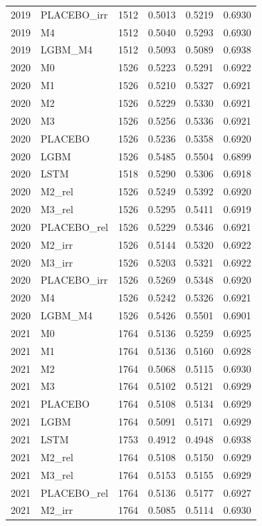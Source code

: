 \begin{tabular}{llrrrr}
2019 & PLACEBO\_irr & 1512 & 0.5013 & 0.5219 & 0.6930 \\
2019 & M4 & 1512 & 0.5040 & 0.5293 & 0.6930 \\
2019 & LGBM\_M4 & 1512 & 0.5093 & 0.5089 & 0.6938 \\
2020 & M0 & 1526 & 0.5223 & 0.5291 & 0.6922 \\
2020 & M1 & 1526 & 0.5210 & 0.5327 & 0.6921 \\
2020 & M2 & 1526 & 0.5229 & 0.5330 & 0.6921 \\
2020 & M3 & 1526 & 0.5256 & 0.5336 & 0.6921 \\
2020 & PLACEBO & 1526 & 0.5236 & 0.5358 & 0.6920 \\
2020 & LGBM & 1526 & 0.5485 & 0.5504 & 0.6899 \\
2020 & LSTM & 1518 & 0.5290 & 0.5306 & 0.6918 \\
2020 & M2\_rel & 1526 & 0.5249 & 0.5392 & 0.6920 \\
2020 & M3\_rel & 1526 & 0.5295 & 0.5411 & 0.6919 \\
2020 & PLACEBO\_rel & 1526 & 0.5229 & 0.5346 & 0.6921 \\
2020 & M2\_irr & 1526 & 0.5144 & 0.5320 & 0.6922 \\
2020 & M3\_irr & 1526 & 0.5203 & 0.5321 & 0.6922 \\
2020 & PLACEBO\_irr & 1526 & 0.5269 & 0.5348 & 0.6920 \\
2020 & M4 & 1526 & 0.5242 & 0.5326 & 0.6921 \\
2020 & LGBM\_M4 & 1526 & 0.5426 & 0.5501 & 0.6901 \\
2021 & M0 & 1764 & 0.5136 & 0.5259 & 0.6925 \\
2021 & M1 & 1764 & 0.5136 & 0.5160 & 0.6928 \\
2021 & M2 & 1764 & 0.5068 & 0.5115 & 0.6930 \\
2021 & M3 & 1764 & 0.5102 & 0.5121 & 0.6929 \\
2021 & PLACEBO & 1764 & 0.5108 & 0.5134 & 0.6929 \\
2021 & LGBM & 1764 & 0.5091 & 0.5171 & 0.6929 \\
2021 & LSTM & 1753 & 0.4912 & 0.4948 & 0.6938 \\
2021 & M2\_rel & 1764 & 0.5108 & 0.5150 & 0.6929 \\
2021 & M3\_rel & 1764 & 0.5153 & 0.5155 & 0.6929 \\
2021 & PLACEBO\_rel & 1764 & 0.5136 & 0.5177 & 0.6927 \\
2021 & M2\_irr & 1764 & 0.5085 & 0.5114 & 0.6930 \\

\end{tabular}
